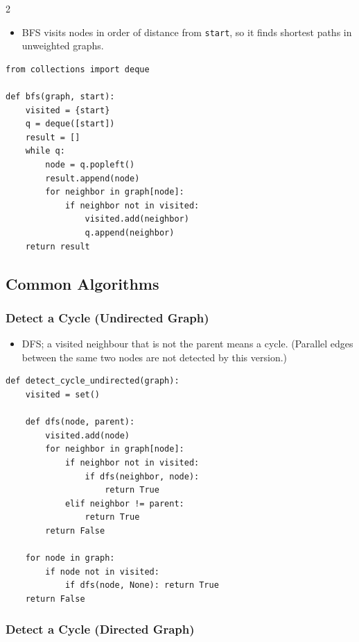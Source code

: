 \documentclass[9pt,a4paper]{extarticle}
\newlength{\tw}
\begin{document}
\begin{multicols}{2}
\begin{itemize}
\item BFS visits nodes in order of distance from \texttt{start}, so it finds shortest paths in unweighted graphs.
\end{itemize}

\begin{lstlisting}
from collections import deque

def bfs(graph, start):
    visited = {start}
    q = deque([start])
    result = []
    while q:
        node = q.popleft()
        result.append(node)
        for neighbor in graph[node]:
            if neighbor not in visited:
                visited.add(neighbor)
                q.append(neighbor)
    return result
\end{lstlisting}

\subsection{Common Algorithms}

\subsubsection{Detect a Cycle (Undirected Graph)}

\begin{itemize}
\item DFS; a visited neighbour that is not the parent means a cycle. (Parallel edges between the same two nodes are not detected by this version.)
\end{itemize}

\begin{lstlisting}
def detect_cycle_undirected(graph):
    visited = set()

    def dfs(node, parent):
        visited.add(node)
        for neighbor in graph[node]:
            if neighbor not in visited:
                if dfs(neighbor, node):
                    return True
            elif neighbor != parent:
                return True
        return False

    for node in graph:
        if node not in visited:
            if dfs(node, None): return True
    return False
\end{lstlisting}

\subsubsection{Detect a Cycle (Directed Graph)}


\end{multicols}
\end{document}
